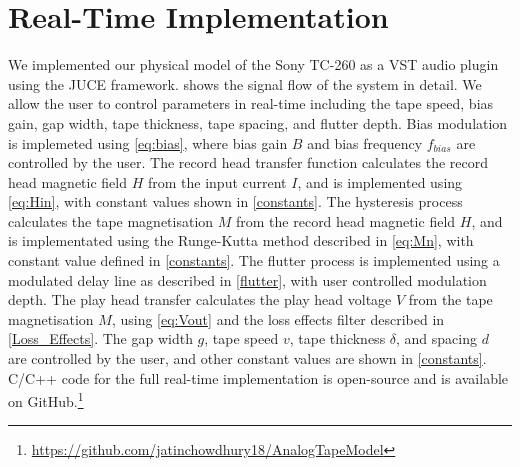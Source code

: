 \documentclass[twoside,a4paper]{article}
\begin{document}
\section{Real-Time Implementation}
We implemented our physical model of the Sony TC-260 as a
VST audio plugin using the JUCE framework. 
shows the signal flow of the system in detail. We allow the user
to control parameters in real-time including the tape speed, bias gain, gap
width, tape thickness, tape spacing, and flutter depth.
\newline\newline
Bias modulation is implemeted using \cref{eq:bias}, where bias gain
$B$ and bias frequency $f_{bias}$ are controlled by the user.
\newline\newline
The record head transfer function calculates the record head magnetic
field $H$ from the input current $I$, and is implemented using \cref{eq:Hin},
with constant values shown in \cref{constants}.
\newline\newline
The hysteresis process calculates the tape magnetisation $M$ from the
record head magnetic field $H$, and is implementated using the Runge-Kutta
method described in \cref{eq:Mn}, with constant value defined in \cref{constants}.
\newline\newline
The flutter process is implemented using a modulated delay line as described in
\cref{flutter}, with user controlled modulation depth.
\newline\newline
The play head transfer calculates the play head voltage $V$ from the
tape magnetisation $M$, using \cref{eq:Vout} and the loss effects filter
described in \cref{Loss_Effects}. The gap width $g$, tape speed $v$, tape
thickness $\delta$, and spacing $d$ are controlled by the user, and
other constant values are shown in \cref{constants}.
\newline\newline
C/C++ code for the full real-time implementation is open-source
and is available on GitHub.\footnote{\url{https://github.com/jatinchowdhury18/AnalogTapeModel}}

%
\end{document}
